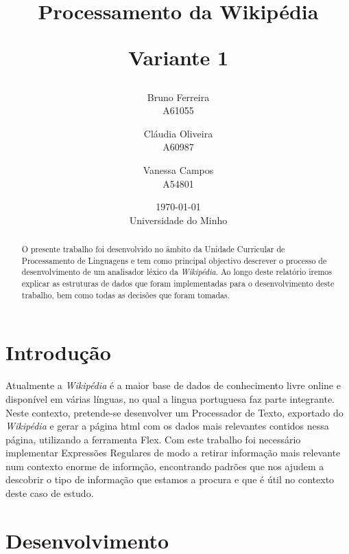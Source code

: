\documentclass[11pt, a4paper, oneside]{article}
\begin{document}
\title{Processamento da Wikipédia\\
\begin{normalsize}
Variante 1
\end{normalsize}}
\date{\today\\Universidade do Minho}
\author{
  Bruno Ferreira\\
  {\small A61055}\\
  \and
  Cláudia Oliveira\\
  {\small A60987}\\
  \and
  Vanessa Campos\\
  {\small A54801}\\
}

\maketitle
\begin{abstract}

  O presente trabalho foi desenvolvido no âmbito da Unidade Curricular de Processamento de Linguagens e tem como principal objectivo descrever o processo de desenvolvimento de um analisador léxico da \textit{Wikipédia}. Ao longo deste relatório iremos explicar as estruturas de dados que foram implementadas para o desenvolvimento deste trabalho, bem como todas as decisões que foram tomadas.

\end{abstract}
\newpage

\tableofcontents
\listoffigures 

\newpage
\section{Introdução}

Atualmente a \textit{Wikipédia} é a maior base de dados de conhecimento livre online e disponível em várias línguas, no qual a lingua portuguesa faz parte integrante. Neste contexto, pretende-se desenvolver um Processador de Texto, exportado do \textit{Wikipédia} e gerar a página html com os dados mais relevantes contidos nessa página, utilizando a ferramenta Flex. 
Com este trabalho foi necessário implementar Expressões Regulares de modo a retirar informação mais relevante num contexto enorme de informção, encontrando padrões que nos ajudem a descobrir o tipo de informação que estamos a procura e que é útil no contexto deste caso de estudo.


\newpage
\section{Desenvolvimento}
\end{document}
